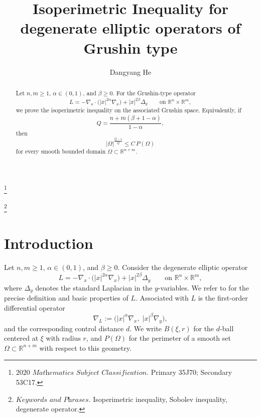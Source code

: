 \documentclass[12pt]{amsart}
\theoremstyle{plain}
\theoremstyle{definition}
\numberwithin{equation}{section}
\newcommand\blfootnote[1]{%
  \begingroup
  \renewcommand\thefootnote{}\footnote{#1}%
  \addtocounter{footnote}{-1}%
  \endgroup
}
\begin{document}
\title[Isoperimetric Inequality on Grushin space]{Isoperimetric Inequality for degenerate elliptic operators of Grushin type} 
\date{}
\author{Dangyang He}  %
\address{Department of Mathematics, Sun Yat-sen University, Guangzhou 510275, Guangdong, P.R. China}






\begin{abstract}
Let \(n,m\ge 1\), \(\alpha\in(0,1)\), and \(\beta\ge 0\). For the Grushin-type operator
\[
L=-\nabla_x\!\cdot\!\bigl(|x|^{2\alpha}\nabla_x\bigr)+|x|^{2\beta}\Delta_y
\qquad \text{on } \mathbb R^n\times \mathbb R^m,
\]
we prove the isoperimetric inequality on the associated Grushin space. Equivalently, if
\[
Q=\frac{n+m(\beta+1-\alpha)}{1-\alpha},
\]
then
\[
|\Omega|^{\frac{Q-1}{Q}}\le C\,P(\Omega)
\]
for every smooth bounded domain \(\Omega\subset \mathbb R^{n+m}\).
\end{abstract}

\maketitle

\tableofcontents


\blfootnote{$\textit{2020 Mathematics Subject Classification.}$ Primary 35J70; Secondary 53C17.}

\blfootnote{$\textit{Keywords and Phrases.}$ Isoperimetric inequality, Sobolev inequality, degenerate operator.}






\section{Introduction}

Let \(n,m\ge 1\), \(\alpha\in(0,1)\), and \(\beta\ge 0\). Consider the degenerate elliptic operator
\begin{equation}\label{eq:L}
L=-\nabla_x\!\cdot\!\bigl(|x|^{2\alpha}\nabla_x\bigr)+|x|^{2\beta}\Delta_y
\qquad \text{on } \mathbb R^n\times \mathbb R^m,
\end{equation}
where \(\Delta_y\) denotes the standard Laplacian in the \(y\)-variables. We refer to \cite{RS} for the precise definition and basic properties of \(L\). Associated with \(L\) is the first-order differential operator
\[
\nabla_L:=\bigl(|x|^\alpha \nabla_x,\; |x|^\beta \nabla_y\bigr),
\]
and the corresponding control distance \(d\). We write \(B(\xi,r)\) for the \(d\)-ball centered at \(\xi\) with radius \(r\), and \(P(\Omega)\) for the perimeter of a smooth set \(\Omega\subset \mathbb R^{n+m}\) with respect to this geometry.
\end{document}

